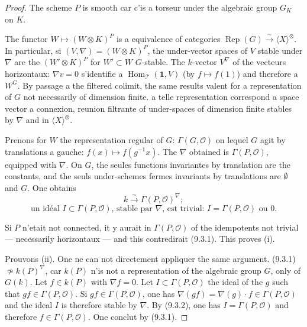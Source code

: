 \documentclass[12pt,a4paper]{article}
\theoremstyle{plain}
\theoremstyle{definition}
\DeclareMathOperator{\Hom}{Hom}
\DeclareMathOperator{\Rep}{Rep}
\begin{document}
\begin{proof}
The scheme $P$ is smooth car c'is a torseur under the algebraic group $G_K$ on $K$.

The functor $W \mapsto (W \otimes K)^P$ is a equivalence of categories $\Rep(G) \xrightarrow{\sim} \langle X \rangle^\otimes$. In particular, si $(V, \nabla) = (W \otimes K)^P$, the under-vector spaces of $V$ stable under $\nabla$ are the $(W' \otimes K)^P$ for $W' \subset W$ $G$-stable. The $k$-vector $V^\nabla$ of the vecteurs horizontaux: $\nabla v = 0$ s'identifie a $\Hom_\mathcal{T}(\mathbf{1}, V)$ (by $f \mapsto f(1)$) and therefore a $W^G$. By passage a the filtered colimit, the same results valent for a representation of $G$ not necessarily of dimension finite. a telle representation correspond a space vector a connexion, reunion filtrante of under-spaces of dimension finite stables by $\nabla$ and in $\langle X \rangle^\otimes$.

Prenons for $W$ the representation regular of $G$: $\Gamma(G, \mathcal{O})$ on lequel $G$ agit by translations a gauche: $f(x) \mapsto f(g^{-1}x)$. The $\nabla$ obtained is $\Gamma(P, \mathcal{O})$, equipped with $\nabla$. On $G$, the seules functions invariantes by translation are the constants, and the seuls under-schemes fermes invariants by translations are $\emptyset$ and $G$. One obtains
\begin{equation}\label{eq:9.3.1}
k \xrightarrow{\sim} \Gamma(P, \mathcal{O})^\nabla;
\end{equation}
\begin{equation}\label{eq:9.3.2}
\text{un idéal } I \subset \Gamma(P, \mathcal{O}) \text{, stable par } \nabla \text{, est trivial: } I = \Gamma(P, \mathcal{O}) \text{ ou } 0.
\end{equation}

Si $P$ n'etait not connected, it y aurait in $\Gamma(P, \mathcal{O})$ of the idempotents not trivial --- necessarily horizontaux --- and this contredirait (9.3.1). This proves (i).

Prouvons (ii). One ne can not directement appliquer the same argument. (9.3.1) $\not\simeq k(P)^\nabla$, car $k(P)$ n'is not a representation of the algebraic group $G$, only of $G(k)$. Let $f \in k(P)$ with $\nabla f = 0$. Let $I \subset \Gamma(P, \mathcal{O})$ the ideal of the $g$ such that $gf \in \Gamma(P, \mathcal{O})$. Si $gf \in \Gamma(P, \mathcal{O})$, one has $\nabla(gf) = \nabla(g) \cdot f \in \Gamma(P, \mathcal{O})$ and the ideal $I$ is therefore stable by $\nabla$. By (9.3.2), one has $I = \Gamma(P, \mathcal{O})$ and therefore $f \in \Gamma(P, \mathcal{O})$. One conclut by (9.3.1).
\end{proof}
\end{document}
